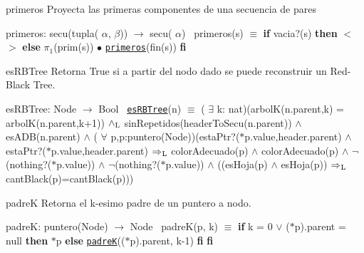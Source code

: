 \begin{DoxyParagraph}{primeros}
Proyecta las primeras componentes de una secuencia de pares

primeros\+: secu(tupla( $\alpha$, $\beta$)) $\to$ secu( $\alpha$)~\newline
 primeros(s) $\equiv$ {\bfseries if} vacia?(s) {\bfseries then} $<$$>$ {\bfseries else} $\pi_1$(prim(s)) $\bullet$ \href{axiomas.html#primeros}{\tt primeros}(fin(s)) {\bfseries fi} 
\end{DoxyParagraph}


\begin{DoxyParagraph}{es\+R\+B\+Tree}
Retorna True si a partir del nodo dado se puede reconstruir un Red-\/\+Black Tree.

es\+R\+B\+Tree\+: Node $\to$ Bool~\newline
 \href{axiomas.html#esRBTree}{\tt es\+R\+B\+Tree}(n) $\equiv$ ( $\exists$ k\+: nat)(arbolK(n.\+parent,k) = arbolK(n.\+parent,k+1)) $\land_{\rm L}$ sin\+Repetidos(header\+To\+Secu(n.\+parent)) $\land$ es\+A\+DB(n.\+parent) $\land$ ( $\forall$ p,p\textquotesingle{}\+:puntero(\+Node))(esta\+Ptr?($\ast$p.value,header.\+parent) $\land$ esta\+Ptr?($\ast$p\textquotesingle{}.value,header.\+parent) $\Rightarrow_{\rm L}$ color\+Adecuado(p) $\land$ color\+Adecuado(p\textquotesingle{}) $\land$ $\lnot$(nothing?($\ast$p.value)) $\land$ $\lnot$(nothing?($\ast$p\textquotesingle{}.value)) $\land$ ((es\+Hoja(p) $\land$ es\+Hoja(p\textquotesingle{})) $\Rightarrow_{\rm L}$ cant\+Black(p)=cant\+Black(p\textquotesingle{})))


\end{DoxyParagraph}
\begin{DoxyParagraph}{padreK}
Retorna el k-\/esimo padre de un puntero a nodo.

padreK\+: puntero(\+Node) $\to$ Node~\newline
 padre\+K(p, k) $\equiv$ {\bfseries if} k = 0 $\lor$ ($\ast$p).parent = null {\bfseries then} $\ast$p {\bfseries else} \href{axiomas.html#padreK}{\tt padreK}(($\ast$p).parent, k-\/1) {\bfseries fi} {\bfseries fi} 
\end{DoxyParagraph}
